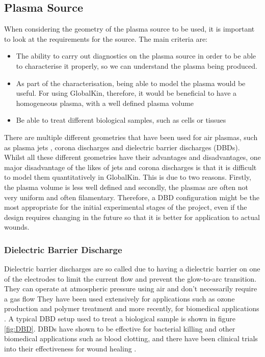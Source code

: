 \documentclass[11pt, oneside]{article}   	%
\begin{document}
\subsection{Plasma Source}
When considering the geometry of the plasma source to be used, it is important to look at the requirements for the source.
The main criteria are:
\begin{itemize}
\item The ability to carry out diagnostics on the plasma source in order to be able to characterise it properly, so we can understand the plasma being produced. 
\item As part of the characterisation, being able to model the plasma would be useful. For using GlobalKin, therefore, it would be beneficial to have a homogeneous plasma, with a well defined plasma volume
\item Be able to treat different biological samples, such as cells or tissues
\end{itemize}

There are multiple different geometries that have been used for air plasmas, such as plasma jets \cite{Pei2012inactivation, Chen2009blood, Walsh2011portable}, corona discharges \cite{Dobrynin2011inactivation} and dielectric barrier discharges (DBDs).
Whilst all these different geometries have their advantages and disadvantages, one major disadvantage of the likes of jets and corona discharges is that it is difficult to model them quantitatively in GlobalKin.
This is due to two reasons.
Firstly, the plasma volume is less well defined and secondly, the plasmas are often not very uniform and often filamentary.
Therefore, a DBD configuration might be the most appropriate for the initial experimental stages of the project, even if the design requires changing in the future so that it is better for application to actual wounds.


\subsubsection{Dielectric Barrier Discharge}
Dielectric barrier discharges are so called due to having a dielectric barrier on one of the electrodes to limit the current flow and prevent the glow-to-arc transition. 
They can operate at atmospheric pressure using air and don't necessarily require a gas flow \cite{Fridman2013plasmamedicine}
They have been used extensively for applications such as ozone production and polymer treatment and more recently, for biomedical applications \cite{Fridman2013plasmamedicine, Brehmer2015alleviation}.
A typical DBD setup used to treat a biological sample is shown in figure \ref{fig:DBD}.
DBDs have shown to be effective for bacterial killing and other biomedical applications such as blood clotting, and there have been clinical trials into their effectiveness for wound healing \cite{Daeschlein2012in, Fridman2006blood, Brehmer2015alleviation}. 
\end{document}
